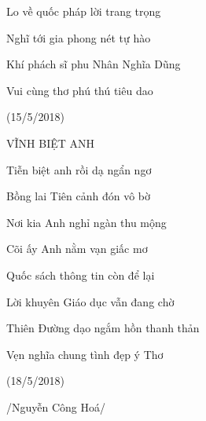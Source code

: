 Lo về quốc pháp lời trang trọng

Nghĩ tới gia phong nét tự hào

Khí phách sĩ phu Nhân Nghĩa Dũng

Vui cùng thơ phú thú tiêu dao

(15/5/2018)

VĨNH BIỆT ANH 

Tiễn biệt anh rồi dạ ngẩn ngơ

Bồng lai Tiên cảnh đón vô bờ

Nơi kia Anh nghỉ ngàn thu mộng

Cõi ấy Anh nằm vạn giấc mơ

Quốc sách thông tin còn để lại

Lời khuyên Giáo dục vẫn đang chờ

Thiên Đường dạo ngắm hồn thanh thản

Vẹn nghĩa chung tình đẹp ý Thơ

(18/5/2018)

/Nguyễn Công Hoá/